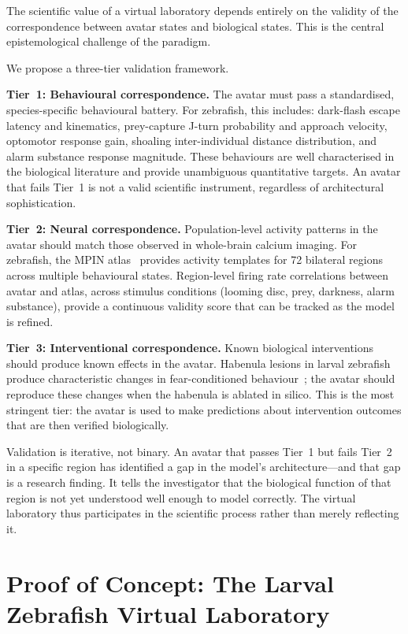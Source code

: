 \documentclass[12pt,a4paper]{article}
\begin{document}
The scientific value of a virtual laboratory depends entirely on the
validity of the correspondence between avatar states and biological
states.
This is the central epistemological challenge of the paradigm.

We propose a three-tier validation framework.

\textbf{Tier~1: Behavioural correspondence.}
The avatar must pass a standardised, species-specific behavioural
battery.
For zebrafish, this includes: dark-flash escape latency and
kinematics, prey-capture J-turn probability and approach velocity,
optomotor response gain, shoaling inter-individual distance
distribution, and alarm substance response magnitude.
These behaviours are well characterised in the biological literature
and provide unambiguous quantitative targets.
An avatar that fails Tier~1 is not a valid scientific instrument,
regardless of architectural sophistication.

\textbf{Tier~2: Neural correspondence.}
Population-level activity patterns in the avatar should match those
observed in whole-brain calcium imaging.
For zebrafish, the MPIN atlas~\cite{kunst2019} provides activity
templates for 72 bilateral regions across multiple behavioural states.
Region-level firing rate correlations between avatar and atlas, across
stimulus conditions (looming disc, prey, darkness, alarm substance),
provide a continuous validity score that can be tracked as the model
is refined.

\textbf{Tier~3: Interventional correspondence.}
Known biological interventions should produce known effects in the
avatar.
Habenula lesions in larval zebrafish produce characteristic changes in
fear-conditioned behaviour~\cite{agetsuma2010}; the avatar should
reproduce these changes when the habenula is ablated in silico.
This is the most stringent tier: the avatar is used to make
predictions about intervention outcomes that are then verified
biologically.

Validation is iterative, not binary.
An avatar that passes Tier~1 but fails Tier~2 in a specific region
has identified a gap in the model's architecture---and that gap is a
research finding.
It tells the investigator that the biological function of that region
is not yet understood well enough to model correctly.
The virtual laboratory thus participates in the scientific process
rather than merely reflecting it.


\section*{Proof of Concept: The Larval Zebrafish Virtual Laboratory}
\end{document}
